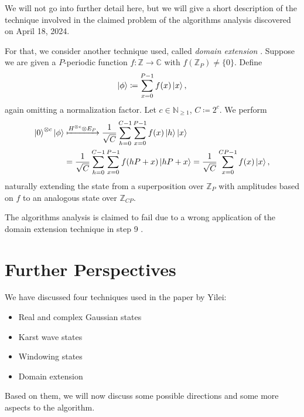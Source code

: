\documentclass[10pt]{amsart}
\theoremstyle{definition}
\theoremstyle{remark}
\begin{document}
    \phantom{}
    
    We will not go into further detail here, but we will give a short description of the technique involved in the claimed problem of the algorithms analysis discovered on April 18, 2024.
    
    \phantom{}
    
    For that, we consider another technique used, called \emph{domain extension} \cite[p. 14]{Chen2024}. Suppose we are given a \(P\)-periodic function \(f\colon \mathbb{Z} \to \mathbb{C}\) with \(f(\mathbb{Z}_P) \neq \{0\}\). Define
    \begin{align}
        \ket{\phi} \coloneqq \sum_{x=0}^{P-1} f(x) \ket{x},
    \end{align}
    again omitting a normalization factor. Let \(c \in \mathbb{N}_{\geq 1}\), \(C \coloneqq 2^c\). We perform
    \begin{align}
        \ket{0}^{\otimes c}\ket{\phi} &\xmapsto{H^{\otimes c} \otimes E_P} \frac{1}{\sqrt{C}} \sum_{h=0}^{C-1}\sum_{x=0}^{P-1} f(x) \ket{h}\ket{x}\\
        &= \frac{1}{\sqrt{C}} \sum_{h=0}^{C-1}\sum_{x=0}^{P-1} f(hP+x) \ket{hP+x} = \frac{1}{\sqrt{C}} \sum_{x = 0}^{CP-1} f(x)\ket{x},
    \end{align}
    naturally extending the state from a superposition over \(\mathbb{Z}_P\) with amplitudes based on \(f\) to an analogous state over \(\mathbb{Z}_{CP}\).
    
    \phantom{}

    The algorithms analysis is claimed to fail due to a wrong application of the domain extension technique in step 9 \cite[pp. 34-38]{Chen2024}.

    \section{Further Perspectives}

    We have discussed four techniques used in the paper by Yilei: 
    \begin{itemize}
        \item Real and complex Gaussian states
        \item Karst wave states
        \item Windowing states
        \item Domain extension
    \end{itemize}
    Based on them, we will now discuss some possible directions and some more aspects to the algorithm.
\end{document}
